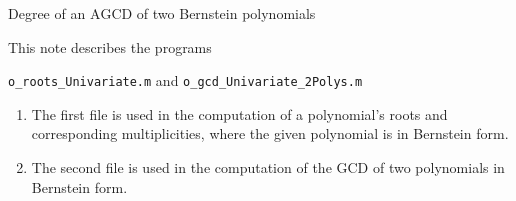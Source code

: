 \documentclass{article}
\newcommand{\AGCD}{\textrm{AGCD}}
\begin{document}
\begin{center}
Degree of an $\AGCD$ of two Bernstein polynomials
\end{center}
%
\date{}
%

\hrulefill


\vspace{0.5cm}

This note describes the programs
%
\begin{center}
\texttt{o\_roots\_Univariate.m} 
and 
\texttt{o\_gcd\_Univariate\_2Polys.m}
\end{center}
%
\begin{enumerate}

	\item The first file is used in the computation of a polynomial's roots and corresponding multiplicities, where the given polynomial is in Bernstein form.
	
	\item The second file is used in the computation of the \gls{GCD} of two polynomials in Bernstein form.


\end{enumerate}
\end{document}
